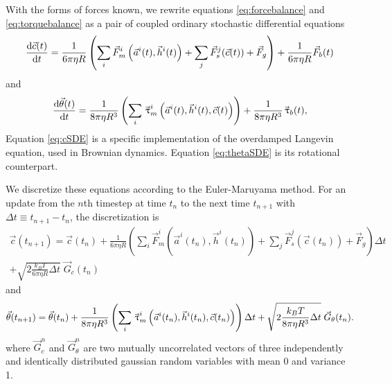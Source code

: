 With the forms of forces known, we  rewrite equations \ref{eq:forcebalance} and \ref{eq:torquebalance} as a pair of coupled ordinary stochastic differential equations
\begin{equation} \label{eq:cSDE}
\dv{\vec{c}(t)}{t} = 
%
\frac{1}{6 \pi \eta R} \left( 
\sum_i \vec{F}_m^i \left( \vec{a}^i(t) ,\vec{h}^i(t) \right) + 
\sum_j \vec{F}_s^j(\vec{c}(t)) + 
\vec{F}_g 
\right) + 
%
\frac{1}{6 \pi \eta R} \vec{F}_b(t)
\end{equation}
and
\begin{equation} \label{eq:thetaSDE}
\dv{\vec{\theta}(t)}{t}=
%
\frac{1}{8 \pi \eta R^3} \left( 
\sum_i \vec{\tau}_m^i \left( \vec{a}^i(t) ,\vec{h}^i(t) ,\vec{c}(t) \right) 
\right) + 
%
\frac{1}{8 \pi \eta R^3} \vec{\tau}_b(t),
\end{equation}
Equation \ref{eq:cSDE} is a specific implementation of the overdamped Langevin equation, used in Brownian dynamics. Equation \ref{eq:thetaSDE} is its rotational counterpart.

We discretize these equations according to the Euler-Maruyama method. For an update from the $n$th timestep at time $t_n$ to the next time $t_{n+1}$ with $\Delta t \equiv t_{n+1}-t_n$, the discretization is
\begin{multline} \label{eq:cSDE_discretized}
\vec{c}(t_{n+1}) = \vec{c}(t_n) +
\frac{1}{6 \pi \eta R} \left( \sum_i \vec{F}_m^i \left( \vec{a}^i(t_n) ,\vec{h}^i(t_n) \right) + \sum_j \vec{F}_s^j(\vec{c}(t_n)) + \vec{F}_g \right) \Delta t \\
+ \sqrt{2 \frac{k_B T}{6 \pi \eta R} \Delta t} \;\vec{G}_c(t_n)
\end{multline}
and
\begin{equation} \label{eq:thetaSDE_discretized}
\vec{\theta}(t_{n+1})= \vec{\theta}(t_n) +
\frac{1}{8 \pi \eta R^3} \left( \sum_i \vec{\tau}_m^i \left( \vec{a}^i(t_n) ,\vec{h}^i(t_n) , \vec{c}(t_n) \right) \right) \Delta t + \\
\sqrt{2 \frac{k_B T}{8 \pi \eta R^3} \Delta t} \;\vec{G}_\theta(t_n).
\end{equation}
where $\vec{G}_c^n$ and $\vec{G}_\theta^n$ are two mutually uncorrelated vectors of three independently and identically distributed gaussian random variables with mean \num{0} and variance \num{1}.


